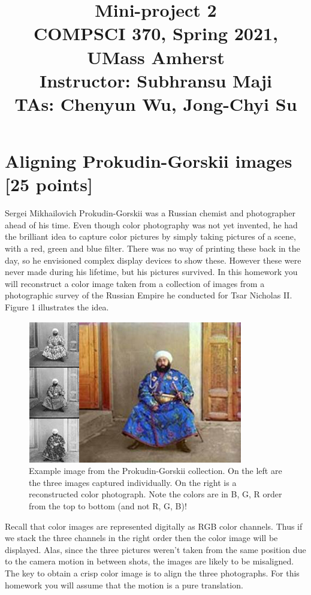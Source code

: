 \documentclass[10pt,letterpaper]{article}
\title{
	Mini-project 2 \\
	\Large{COMPSCI 370, Spring 2021, UMass Amherst} \\
	\Large{Instructor: Subhransu Maji} \\
	\Large{TAs: Chenyun Wu, Jong-Chyi Su}
}
\date{}
\begin{document}
\maketitle

\renewcommand\thesubsection{\thesection.\alph{subsection}}

\newpage



\section{Aligning Prokudin-Gorskii images [25 points]} 
Sergei Mikhailovich Prokudin-Gorskii was a Russian chemist and photographer ahead of his time. 
Even though color photography was not yet invented, he had the brilliant idea to capture color pictures by simply taking pictures of a scene, with a red, green and blue filter.
There was no way of printing these back in the day, so he envisioned complex display devices to show these. However these were never made during his lifetime, but his pictures survived. 
In this homework you will reconstruct a color image taken from a collection of images from a photographic survey of the Russian Empire he conducted for Tsar Nicholas II. 
Figure 1 illustrates the idea.

\begin{figure}[h]
\centering
\includegraphics[width=0.65\linewidth]{example-Prokudin-Gorskii.png}
\caption{Example image from the Prokudin-Gorskii collection. On the left are the three images captured individually. On the right is a reconstructed color photograph. Note the colors are in B, G, R order from the top to bottom (and not R, G, B)!}
\end{figure}

Recall that color images are represented digitally as RGB color channels. Thus if we stack the three channels in the right order then the color image will be displayed. 
Alas, since the three pictures weren't taken from the same position due to the camera motion in between shots, the images are likely to be misaligned. 
The key to obtain a crisp color image is to align the three photographs.
For this homework you will assume that the motion is a pure translation.
\end{document}
